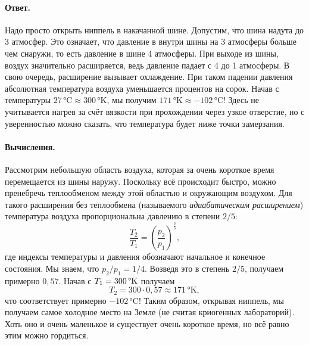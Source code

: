 \paragraph{Ответ.}
Надо просто открыть ниппель в накачанной шине.
Допустим, что шина надута до 3 атмосфер.
Это означает, что давление в внутри шины на 3 атмосферы больше чем снаружи, то есть давление в шине 4 атмосферы.
При выходе из шины, воздух значительно расширяется, ведь давление падает с 4 до 1 атмосферы.
В свою очередь, расширение вызывает охлаждение.
При таком падении давления абсолютная температура воздуха уменьшается процентов на сорок.
Начав с температуры $27 \,\text{°C} \approx 300\, \text{°K}$, мы получим $171 \,\text{°K} \approx -102\, \text{°C}$!
Здесь не учитывается нагрев за счёт вязкости при прохождении через узкое отверстие, но с уверенностью можно сказать, что температура будет ниже точки замерзания.

\paragraph{Вычисления.}
Рассмотрим небольшую область воздуха, которая за очень короткое время перемещается из шины наружу.
Поскольку всё происходит быстро, можно пренебречь теплообменом между этой областью и окружающим воздухом.
Для такого расширения без теплообмена (называемого \emph{адиабатическим расширением}) температура воздуха пропорциональна давлению в степени $2/5$:
\[\frac{T_2}{T_1}=\left(\frac{p_2}{p_1}\right)^{\tfrac{2}{5}},\]
где индексы температуры и давления обозначают начальное и конечное состояния.
Мы знаем, что $p_2/p_1=1/4$.
Возведя это в степень $2/5$, получаем примерно $0{,}57$.
Начав с $T_1=300 \,\degree\text{K}$ получаем
\[T_2=300 \cdot 0{,}57 \approx 171 \,\text{°K},\]
что соответствует примерно $-102\, \text{°C}$!
Таким образом, открывая ниппель, мы получаем самое холодное место на Земле (не считая криогенных лабораторий).
Хоть оно и очень маленькое и существует очень короткое время, но всё равно этим можно гордиться.
